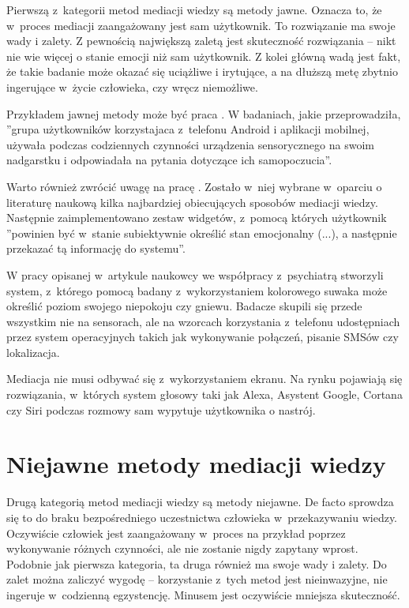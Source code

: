 Pierwszą z~kategorii metod mediacji wiedzy są metody jawne. Oznacza to, że w~proces mediacji zaangażowany jest sam użytkownik. To rozwiązanie ma swoje wady i zalety. Z pewnością największą zaletą jest skuteczność rozwiązania -- nikt nie wie więcej o stanie emocji niż sam użytkownik. Z kolei główną wadą jest fakt, że takie badanie może okazać się uciążliwe i irytujące, a na dłuższą metę zbytnio ingerujące w~życie człowieka, czy wręcz niemożliwe.

Przykładem jawnej metody może być praca \cite{EmiliaPieczonka}. W badaniach, jakie przeprowadziła, ''grupa użytkowników korzystajaca z~telefonu Android i aplikacji mobilnej, używała podczas codziennych czynności urządzenia sensorycznego na swoim nadgarstku i odpowiadała na pytania dotyczące ich samopoczucia''.

Warto również zwrócić uwagę na pracę \cite{ArkadiuszLis}. Zostało w~niej wybrane w~oparciu o literaturę naukową kilka najbardziej obiecujących sposobów mediacji wiedzy. Następnie zaimplementowano zestaw widgetów, z~pomocą których użytkownik ''powinien być w~stanie subiektywnie określić stan emocjonalny (...), a następnie przekazać tą informację do systemu''.

W pracy opisanej w~artykule \cite{hung2016predicting} naukowcy we współpracy z~psychiatrą stworzyli system, z~którego pomocą badany z~wykorzystaniem kolorowego suwaka może określić poziom swojego niepokoju czy gniewu. Badacze skupili się przede wszystkim nie na sensorach, ale na wzorcach korzystania z~telefonu udostępniach przez system operacyjnych takich jak wykonywanie połączeń, pisanie SMSów czy lokalizacja.

Mediacja nie musi odbywać się z~wykorzystaniem ekranu. Na rynku pojawiają się rozwiązania, w~których system głosowy taki jak Alexa, Asystent Google, Cortana czy Siri podczas rozmowy sam wypytuje użytkownika o nastrój.



\section{Niejawne metody mediacji wiedzy}
\label{sec:niejawneMetodyMediacjiWiedzy}

Drugą kategorią metod mediacji wiedzy są metody niejawne. De facto sprowdza się to do braku bezpośredniego uczestnictwa człowieka w~przekazywaniu wiedzy. Oczywiście człowiek jest zaangażowany w~proces na przykład poprzez wykonywanie różnych czynności, ale nie zostanie nigdy zapytany wprost. Podobnie jak pierwsza kategoria, ta druga również ma swoje wady i zalety. Do zalet można zaliczyć wygodę -- korzystanie z~tych metod jest nieinwazyjne, nie ingeruje w~codzienną egzystencję. Minusem jest oczywiście mniejsza skuteczność.

